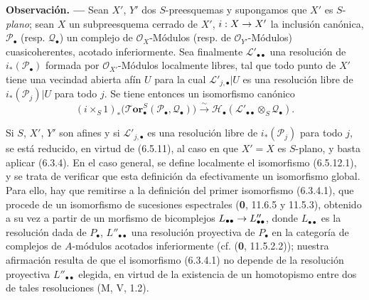 \documentclass[10pt,oneside,openany]{book}
\makeatletter
\theoremstyle{egaenv}\newtheorem*{env}{---}
\theoremstyle{egastatement}
\theoremstyle{egadescription}
\newenvironment{namedtheorem}[2][]{\par\medskip\noindent\setmanualcurrentlabel{#1}\textbf{#2\ifstrempty{#1}{}{ (#1)}. ---}\ifstrequal{#2}{Observación}{\normalfont}{\ifstrequal{#2}{Observaciones}{\normalfont}{\itshape}}}{\par\medskip}
\newcommand{\oldpage}[2][]{\marginnote{\normalfont\scriptsize\textbf{#1}\,|\,#2}\ignorespaces}
\newcommand{\setmanualcurrentlabel}[1]{\def\@currentlabel{#1}}
\renewcommand{\to}{\mathchoice{\longrightarrow}{\rightarrow}{\rightarrow}{\rightarrow}}
\makeatother
\begin{document}
\begin{namedtheorem}[6.5.12]{Observación}
Sean $X'$, $Y'$ dos $S$-preesquemas y supongamos que $X'$ es $S$-\emph{plano};
sean $X$ un subpreesquema cerrado de $X'$, $i:X\to X'$ la inclusión canónica,
$\mathscr P_\bullet$ (resp. $\mathscr Q_\bullet$) un complejo de
$\mathscr O_X$-Módulos (resp. de $\mathscr O_{Y'}$-Módulos) cuasicoherentes,
acotado inferiormente. Sea finalmente $\mathscr L'_{\bullet\bullet}$ una resolución
de $i_*(\mathscr P_\bullet)$ formada por $\mathscr O_{X'}$-Módulos localmente
libres, tal que todo punto de $X'$ tiene una vecindad abierta afín $U$ para
la cual $\mathscr L'_{j,\bullet}|U$ es una resolución libre de
$i_*(\mathscr P_j)|U$ para todo $j$. Se tiene entonces un isomorfismo canónico
\[
  (i\times_S 1)_*
  \bigl(\boldsymbol{\mathscr{T}\!or}_\bullet^S
    (\mathscr P_\bullet,\mathscr Q_\bullet)\bigr)
  \xrightarrow{\sim}
  \mathscr H_\bullet
  (\mathscr L'_{\bullet\bullet}\otimes_S\mathscr Q_\bullet).
  \tag{6.5.12.1}\label{III.6.5.12.1.fr}
\]

Si $S$, $X'$, $Y'$ son afines y si $\mathscr L'_{j,\bullet}$ es una
resolución libre de $i_*(\mathscr P_j)$ para todo $j$, se está reducido, en virtud
de (6.5.11), al caso en que $X'=X$ es $S$-plano, y basta aplicar (6.3.4).
En el caso general, se define localmente el isomorfismo (6.5.12.1), y se
trata de verificar que esta definición da efectivamente un isomorfismo global.
Para ello, hay que remitirse a la definición del primer isomorfismo
(6.3.4.1), que procede de un isomorfismo de sucesiones espectrales (\textbf{0}, 11.6.5 y
11.5.3), obtenido a su vez a partir de un morfismo de bicomplejos
$L_{\bullet\bullet}\to L''_{\bullet\bullet}$, donde $L_{\bullet\bullet}$ es la
resolución dada de $P_\bullet$, $L''_{\bullet\bullet}$ una resolución
proyectiva de $P_\bullet$ en la categoría de complejos de $A$-módulos
acotados
\oldpage[III]{152}
inferiormente (cf. (\textbf{0}, 11.5.2.2)); nuestra afirmación resulta de que
el isomorfismo (6.3.4.1) no depende de la resolución proyectiva
$L''_{\bullet\bullet}$ elegida, en virtud de la existencia de un homotopismo entre
dos de tales resoluciones (M, V, 1.2).
\end{namedtheorem}
\end{document}
